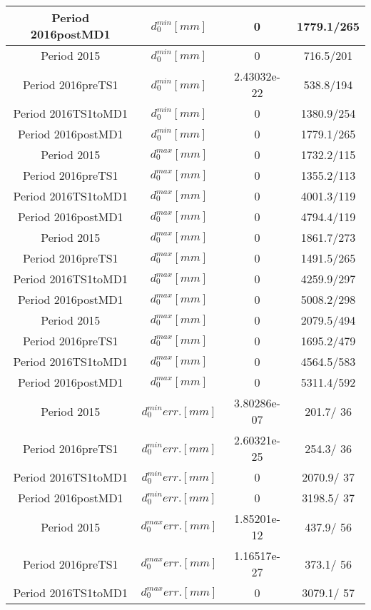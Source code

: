 \documentclass{article}
\begin{document}
\begin{longtable}{c|c|c|c}
\hline
 Period 2016postMD1 & $d_{0}^{min} [mm]$ & 0 & 1779.1/265\\
\hline
 Period 2015 & $d_{0}^{min} [mm]$ & 0 & 716.5/201\\
\hline
 Period 2016preTS1 & $d_{0}^{min} [mm]$ & 2.43032e-22 & 538.8/194\\
\hline
 Period 2016TS1toMD1 & $d_{0}^{min} [mm]$ & 0 & 1380.9/254\\
\hline
 Period 2016postMD1 & $d_{0}^{min} [mm]$ & 0 & 1779.1/265\\
\hline
 Period 2015 & $d_{0}^{max} [mm]$ & 0 & 1732.2/115\\
\hline
 Period 2016preTS1 & $d_{0}^{max} [mm]$ & 0 & 1355.2/113\\
\hline
 Period 2016TS1toMD1 & $d_{0}^{max} [mm]$ & 0 & 4001.3/119\\
\hline
 Period 2016postMD1 & $d_{0}^{max} [mm]$ & 0 & 4794.4/119\\
\hline
 Period 2015 & $d_{0}^{max} [mm]$ & 0 & 1861.7/273\\
\hline
 Period 2016preTS1 & $d_{0}^{max} [mm]$ & 0 & 1491.5/265\\
\hline
 Period 2016TS1toMD1 & $d_{0}^{max} [mm]$ & 0 & 4259.9/297\\
\hline
 Period 2016postMD1 & $d_{0}^{max} [mm]$ & 0 & 5008.2/298\\
\hline
 Period 2015 & $d_{0}^{max} [mm]$ & 0 & 2079.5/494\\
\hline
 Period 2016preTS1 & $d_{0}^{max} [mm]$ & 0 & 1695.2/479\\
\hline
 Period 2016TS1toMD1 & $d_{0}^{max} [mm]$ & 0 & 4564.5/583\\
\hline
 Period 2016postMD1 & $d_{0}^{max} [mm]$ & 0 & 5311.4/592\\
\hline
 Period 2015 & $d_{0}^{min} err. [mm]$ & 3.80286e-07 & 201.7/ 36\\
\hline
 Period 2016preTS1 & $d_{0}^{min} err. [mm]$ & 2.60321e-25 & 254.3/ 36\\
\hline
 Period 2016TS1toMD1 & $d_{0}^{min} err. [mm]$ & 0 & 2070.9/ 37\\
\hline
 Period 2016postMD1 & $d_{0}^{min} err. [mm]$ & 0 & 3198.5/ 37\\
\hline
 Period 2015 & $d_{0}^{max} err. [mm]$ & 1.85201e-12 & 437.9/ 56\\
\hline
 Period 2016preTS1 & $d_{0}^{max} err. [mm]$ & 1.16517e-27 & 373.1/ 56\\
\hline
 Period 2016TS1toMD1 & $d_{0}^{max} err. [mm]$ & 0 & 3079.1/ 57\\

\end{longtable}
\end{document}
